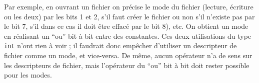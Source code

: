 Par exemple, en ouvrant un fichier on précise le mode du fichier (lecture,
écriture ou les deux) par les bits 1 et 2, s'il faut créer le fichier ou non
s'il n'existe pas par le bit 7, s'il dans ce cas il doit être effacé par le bit
8), etc. On obtient un mode en réalisant un ``ou'' bit à bit entre des
constantes. Ces deux utilisations du type \texttt{int} n'ont rien à voir ; il
faudrait donc empêcher d'utiliser un descripteur de fichier comme un mode, et
vice-versa. De même, aucun opérateur n'a de sens sur les descripteurs de
fichier, mais l'opérateur \texttt{\textbar{}} du ``ou'' bit à bit doit rester
possible pour les modes.
